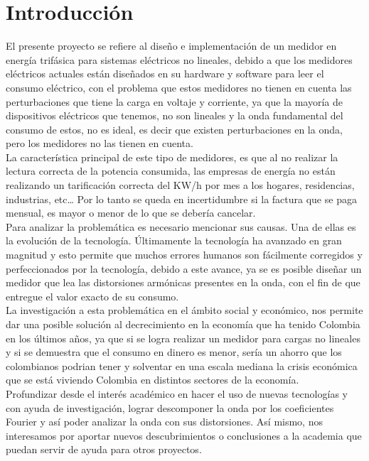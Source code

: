 \setcounter{page}{1}


\newpage{\clearpage}
\chapter{Introducción}

El presente proyecto se refiere al diseño e implementación de un medidor en energía trifásica para sistemas eléctricos no lineales, debido a que los medidores eléctricos actuales están diseñados en su hardware y software para leer el consumo eléctrico, con el problema que estos medidores no tienen en cuenta las perturbaciones que tiene la carga en voltaje y corriente, ya que la mayoría de dispositivos eléctricos que tenemos, no son lineales y la onda fundamental del consumo de estos, no es ideal, es decir que existen perturbaciones en la onda, pero los medidores no las tienen en cuenta. \\

La característica principal de este tipo de medidores, es que al no realizar la lectura correcta de la potencia consumida, las empresas de energía no están realizando un tarificación correcta del KW/h por mes a los hogares, residencias, industrias, etc… Por lo tanto se queda en incertidumbre si la factura que se paga mensual, es mayor o menor de lo que se debería cancelar.\\

Para analizar la problemática es necesario mencionar sus causas. Una de ellas es la evolución de la tecnología. Últimamente la tecnología ha avanzado en gran magnitud y esto permite que muchos errores humanos son fácilmente corregidos y perfeccionados por la tecnología, debido a este avance, ya se es posible diseñar un medidor que lea las distorsiones armónicas presentes en la onda, con el fin de que entregue el valor exacto de su consumo.\\

La investigación a esta problemática en el ámbito social y económico, nos permite dar una posible solución al decrecimiento en la economía que ha tenido Colombia en los últimos años, ya que si se logra realizar un medidor para cargas no lineales y si se demuestra que el consumo en dinero es menor, sería un ahorro que los colombianos podrian tener y solventar en una escala mediana la crisis económica que se está viviendo Colombia en distintos sectores de la economía.\\

Profundizar desde el interés académico en hacer el uso de nuevas tecnologías y con ayuda de investigación, lograr descomponer la onda por los coeficientes Fourier y así poder analizar la onda con sus distorsiones. Así mismo, nos interesamos por aportar nuevos descubrimientos o conclusiones a la academia que puedan servir de ayuda para otros proyectos.\\

